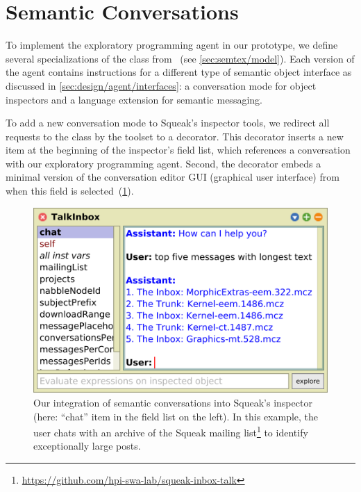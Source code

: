 
\section{Semantic Conversations}
\label{sec:implementation/conversations}

To implement the exploratory programming agent in our prototype, we define several specializations of the  class from \semtex~(see \cref{sec:semtex/model}).
Each version of the agent contains instructions for a different type of semantic object interface as discussed in \cref{sec:design/agent/interfaces}: a conversation mode for object inspectors and a language extension for semantic messaging.

To add a new conversation mode to Squeak's inspector tools, we redirect all requests to the  class by the toolset to a decorator.
This decorator inserts a new  item at the beginning of the inspector's field list, which references a conversation with our exploratory programming agent.
Second, the decorator embeds a minimal version of the conversation editor GUI (graphical user interface) from \semtex when this field is selected~(\cref{fig:implementation/conversations/inspector}).

\begin{figure}
	\begin{minipage}{\textwidth}
		\centering
		\includegraphics[width=.7\textwidth]{03_conversations/inspector.png}
		\caption[Integration of semantic conversations into Squeak's inspector.]{
			Our integration of semantic conversations into Squeak's inspector (here: ``chat'' item in the field list on the left).
			In this example, the user chats with an archive of the Squeak mailing list\footnote{\url{https://github.com/hpi-swa-lab/squeak-inbox-talk}} to identify exceptionally large posts.
		}
		\label{fig:implementation/conversations/inspector}
	\end{minipage}
\end{figure}

